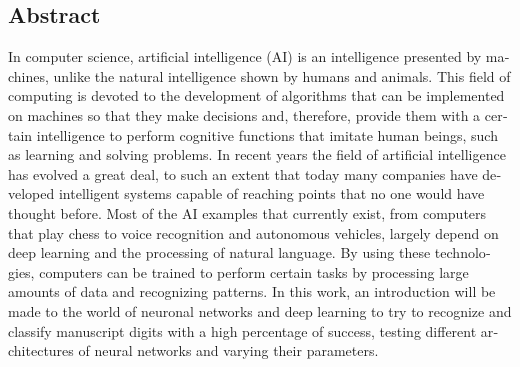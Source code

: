 \begin{otherlanguage}{english}

	\chapter*{Abstract}
	\setcounter{chapter}{-4}
	
	In computer science, artificial intelligence (AI) is an intelligence presented by machines, unlike the natural intelligence shown by humans and animals. This field of computing is devoted to the development of algorithms that can be implemented on machines so that they make decisions and, therefore, provide them with a certain intelligence to perform cognitive functions that imitate human beings, such as learning and solving problems. In recent years the field of artificial intelligence has evolved a great deal, to such an extent that today many companies have developed intelligent systems capable of reaching points that no one would have thought before. Most of the AI examples that currently exist, from computers that play chess to voice recognition and autonomous vehicles, largely depend on deep learning and the processing of natural language. By using these technologies, computers can be trained to perform certain tasks by processing large amounts of data and recognizing patterns. In this work, an introduction will be made to the world of neuronal networks and deep learning to try to recognize and classify manuscript digits with a high percentage of success, testing different architectures of neural networks and varying their parameters.
	
\end{otherlanguage}

\newpage

